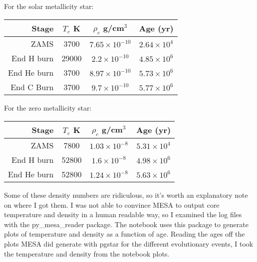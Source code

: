 \documentclass[12pt]{article}
\begin{document}
\subsection{}

For the solar metallicity star:

\begin{center}
\begin{tabular}{|r||c|c|c|}
\hline
Stage  & \(T_c\) K & \(\rho_c\) g/cm\(^3\) & Age (yr)\\ \hline
ZAMS & 3700  & \(7.65 \times 10^{-10}\) &  \(2.64 \times 10^4\)\\ \hline
End H burn & 29000 &\(2.2 \times 10^{-10}\) &\(4.85 \times 10^6\)\\ \hline
End He burn & 3700&\(8.97 \times 10^{-10}\) & \(5.73 \times 10^6\)  \\ \hline
End C Burn & 3700 & \(9.7 \times 10^{-10}\)& \(5.77 \times 10^6\)\\  \hline

\end{tabular}
\end{center}

For the zero metallicity star:


\begin{center}
\begin{tabular}{|r||c|c|c|}
\hline
Stage  & \(T_c\) K & \(\rho_c\) g/cm\(^3\) & Age (yr)\\ \hline
ZAMS & 7800 & \(1.03 \times 10^{-8}\) &  \(5.31 \times 10^4\)\\ \hline
End H burn & 52800 &\(1.6 \times 10^{-8}\) &\( 4.98 \times 10^6\)\\ \hline
End He burn & 52800&\(1.24 \times 10^{-8}\) & \(5.63 \times 10^6\)  \\ \hline

\end{tabular}
\end{center}

Some of these density numbers are ridiculous, so it's worth an explanatory note on where I got them. I was not able to convince MESA to output core temperature and density in a human readable way, so I examined the log files with the py\_mesa\_reader package.  The notebook uses this package to generate plots of temperature and density as a function of age. Reading the ages off the plots MESA did generate with pgstar for the different evolutionary events, I took the temperature and density from the notebook plots.

\subsection{}
\end{document}
